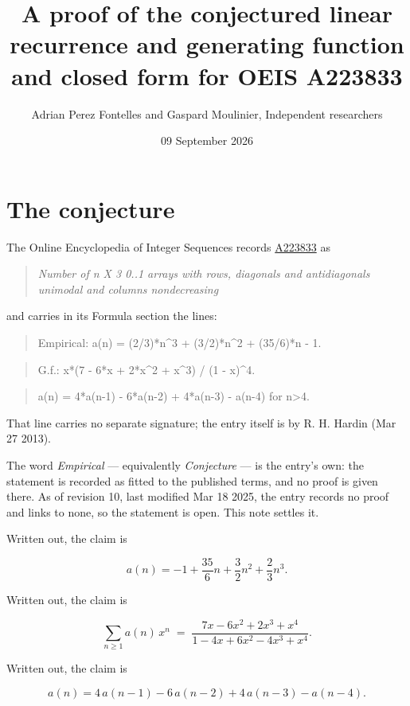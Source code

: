 \documentclass[11pt]{article}
\title{A proof of the conjectured linear recurrence and generating function and closed form for OEIS A223833}
\author{Adrian Perez Fontelles and Gaspard Moulinier, Independent researchers}
\date{09 September 2026}
\theoremstyle{definition}
\begin{document}
\maketitle
\section{The conjecture}

The Online Encyclopedia of Integer Sequences records \href{https://oeis.org/A223833}{A223833} as

\begin{quote}\itshape Number of n X 3 0..1 arrays with rows, diagonals and antidiagonals unimodal and columns nondecreasing\end{quote}

and carries in its Formula section the lines:

\begin{quote}\ttfamily Empirical: a(n) = (2/3)*n\textasciicircum{}3 + (3/2)*n\textasciicircum{}2 + (35/6)*n - 1.\end{quote}

\begin{quote}\ttfamily G.f.: x*(7 - 6*x + 2*x\textasciicircum{}2 + x\textasciicircum{}3) / (1 - x)\textasciicircum{}4.\end{quote}

\begin{quote}\ttfamily a(n) = 4*a(n-1) - 6*a(n-2) + 4*a(n-3) - a(n-4) for n>4.\end{quote}

That line carries no separate signature; the entry itself is by R. H. Hardin (Mar 27 2013).

The word {\itshape Empirical} --- equivalently {\itshape Conjecture} --- is the entry's own: the statement is recorded as fitted to the published terms, and no proof is given there. As of revision 10, last modified Mar 18 2025, the entry records no proof and links to none, so the statement is open. This note settles it.

Written out, the claim is

\[a(n) = -1 + \frac{35}{6}n + \frac{3}{2}n^{2} + \frac{2}{3}n^{3}.\]

Written out, the claim is

\[\sum_{n \ge 1} a(n)\,x^n \;=\; \frac{7x - 6x^{2} + 2x^{3} + x^{4}}{1 - 4x + 6x^{2} - 4x^{3} + x^{4}}.\]

Written out, the claim is

\[a(n) = 4\,a(n-1) - 6\,a(n-2) + 4\,a(n-3) - a(n-4).\]
\end{document}
